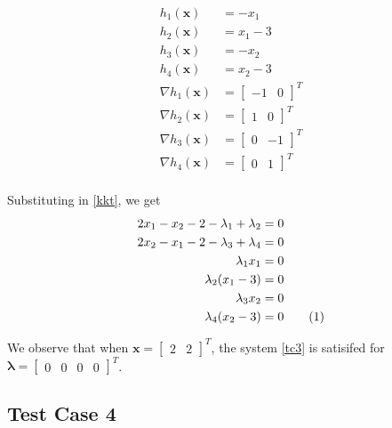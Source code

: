 \documentclass[a4paper]{article}
\newcommand{\numberthis}{\addtocounter{equation}{1}\tag{\theequation}}
\newcommand{\labeleqn}[1]{\numberthis \label{#1}}
\begin{document}
\begin{align*}
h_1(\textbf{x}) &= - x_1 \\
h_2(\textbf{x}) &= x_1 - 3 \\
h_3(\textbf{x}) &= - x_2 \\
h_4(\textbf{x}) &= x_2 - 3 \\
\nabla h_1(\textbf{x}) &= \begin{bmatrix} -1 & 0 \end{bmatrix} ^T \\
\nabla h_2(\textbf{x}) &= \begin{bmatrix} 1 & 0 \end{bmatrix} ^T \\
\nabla h_3(\textbf{x}) &= \begin{bmatrix} 0 & -1 \end{bmatrix} ^T \\
\nabla h_4(\textbf{x}) &= \begin{bmatrix} 0 & 1 \end{bmatrix} ^T \\
\end{align*}

Substituting in \eqref{kkt}, we get
\begin{align*}
2 x_1 - x_2 - 2 - \lambda_1 + \lambda_2 &= 0 \\
2 x_2 - x_1 - 2 - \lambda_3 + \lambda_4 &= 0 \\
\lambda_1 x_1 &= 0 \\
\lambda_2 (x_1 - 3) &= 0 \\
\lambda_3 x_2 &= 0 \\
\lambda_4 (x_2 - 3) &= 0 \labeleqn{tc3}
\end{align*}

We observe that when $\textbf{x} = \begin{bmatrix} 2 & 2 \end{bmatrix} ^T$, the system \eqref{tc3} is satisifed for $\boldsymbol{\lambda} = \begin{bmatrix} 0 & 0 & 0 & 0 \end{bmatrix} ^T$.

\subsection{Test Case 4}
\end{document}
